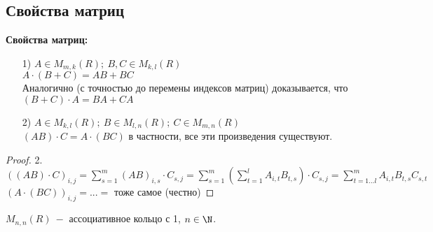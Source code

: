 \subsection{Свойства матриц}
\begin{statement}
    \textbf{Свойства матриц:}
    \begin{enumerate}
        \item[1)] $A\in M_{m,k}(R);\ B,C\in M_{k,l}(R)$  \\
        $A\cdot(B+C)=AB+BC$ \\
        Аналогично (с точностью до перемены индексов матриц) доказывается, 
что $(B+C)\cdot A=BA+CA$
        \item[2)] $A\in M_{k,l}(R);\ B\in M_{l,n}(R);\ C\in M_{m,n}(R)$ \\
        $(AB)\cdot C=A\cdot (BC)$ в частности, все эти произведения 
существуют.
    \end{enumerate}
\end{statement}

\begin{proof}
    2. $((AB)\cdot C)_{i,j}=\sum\limits_{s=1}^{m}(AB)_{i,s}\cdot 
C_{s,j}=\sum\limits_{s=1}^{m}(\sum\limits_{t=1}^{l}A_{i,t}B_{t,s})\cdot 
C_{s,j}=\sum\limits_{t=1...l}^{m}A_{i,t}B_{t,s}C_{s,t}$ \\
    $(A\cdot(BC))_{i,j}=...=$ тоже самое (честно)
\end{proof}

\begin{statement}
    $M_{n,n}(R)\ -$ ассоциативное кольцо с 1, $n\in \N$.
\end{statement}

